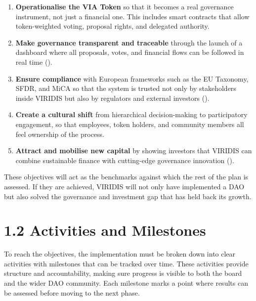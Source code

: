 \documentclass[
  english,
  12pt,
  oneside,
  open=any]{scrbook}
\providecommand{\tightlist}{%
  \setlength{\itemsep}{0pt}\setlength{\parskip}{0pt}}\usepackage{longtable,booktabs,array}
\begin{document}
\begin{enumerate}
\def\labelenumi{\arabic{enumi}.}
\tightlist
\item
  \textbf{Operationalise the VIA Token} so that it becomes a real
  governance instrument, not just a financial one. This includes smart
  contracts that allow token-weighted voting, proposal rights, and
  delegated authority.\\
\item
  \textbf{Make governance transparent and traceable} through the launch
  of a dashboard where all proposals, votes, and financial flows can be
  followed in real time ().\\
\item
  \textbf{Ensure compliance} with European frameworks such as the EU
  Taxonomy, SFDR, and MiCA so that the system is trusted not only by
  stakeholders inside VIRIDIS but also by regulators and external
  investors
  ().\\
\item
  \textbf{Create a cultural shift} from hierarchical decision-making to
  participatory engagement, so that employees, token holders, and
  community members all feel ownership of the process.\\
\item
  \textbf{Attract and mobilise new capital} by showing investors that
  VIRIDIS can combine sustainable finance with cutting-edge governance
  innovation ().
\end{enumerate}

These objectives will act as the benchmarks against which the rest of
the plan is assessed. If they are achieved, VIRIDIS will not only have
implemented a DAO but also solved the governance and investment gap that
has held back its growth.

\section{1.2 Activities and Milestones}\label{sec-milestones}

To reach the objectives, the implementation must be broken down into
clear activities with milestones that can be tracked over time. These
activities provide structure and accountability, making sure progress is
visible to both the board and the wider DAO community. Each milestone
marks a point where results can be assessed before moving to the next
phase.
\end{document}
